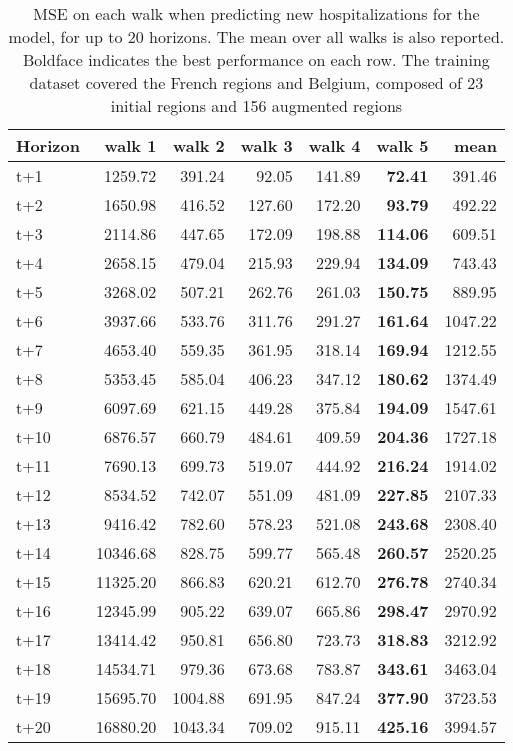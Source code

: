 \begin{table}[H]
\centering
\caption{MSE on each walk when predicting new hospitalizations for the model, for up to 20 horizons. The mean over all walks is also reported. Boldface indicates the best performance on each row. The training dataset covered the French regions and Belgium, composed of 23 initial regions and 156 augmented regions }
\label{tab:MSE_walk_custom_linear_regression}
\begin{tabular}{lrrrrrr}
\toprule
Horizon &   walk 1 &  walk 2 &  walk 3 &  walk 4 &  walk 5 &    mean \\
\midrule
t+1  & 1259.72  & 391.24  & 92.05  & 141.89  & \textbf{72.41}  & 391.46  \\
t+2  & 1650.98  & 416.52  & 127.60  & 172.20  & \textbf{93.79}  & 492.22  \\
t+3  & 2114.86  & 447.65  & 172.09  & 198.88  & \textbf{114.06}  & 609.51  \\
t+4  & 2658.15  & 479.04  & 215.93  & 229.94  & \textbf{134.09}  & 743.43  \\
t+5  & 3268.02  & 507.21  & 262.76  & 261.03  & \textbf{150.75}  & 889.95  \\
t+6  & 3937.66  & 533.76  & 311.76  & 291.27  & \textbf{161.64}  & 1047.22  \\
t+7  & 4653.40  & 559.35  & 361.95  & 318.14  & \textbf{169.94}  & 1212.55  \\
t+8  & 5353.45  & 585.04  & 406.23  & 347.12  & \textbf{180.62}  & 1374.49  \\
t+9  & 6097.69  & 621.15  & 449.28  & 375.84  & \textbf{194.09}  & 1547.61  \\
t+10  & 6876.57  & 660.79  & 484.61  & 409.59  & \textbf{204.36}  & 1727.18  \\
t+11  & 7690.13  & 699.73  & 519.07  & 444.92  & \textbf{216.24}  & 1914.02  \\
t+12  & 8534.52  & 742.07  & 551.09  & 481.09  & \textbf{227.85}  & 2107.33  \\
t+13  & 9416.42  & 782.60  & 578.23  & 521.08  & \textbf{243.68}  & 2308.40  \\
t+14  & 10346.68  & 828.75  & 599.77  & 565.48  & \textbf{260.57}  & 2520.25  \\
t+15  & 11325.20  & 866.83  & 620.21  & 612.70  & \textbf{276.78}  & 2740.34  \\
t+16  & 12345.99  & 905.22  & 639.07  & 665.86  & \textbf{298.47}  & 2970.92  \\
t+17  & 13414.42  & 950.81  & 656.80  & 723.73  & \textbf{318.83}  & 3212.92  \\
t+18  & 14534.71  & 979.36  & 673.68  & 783.87  & \textbf{343.61}  & 3463.04  \\
t+19  & 15695.70  & 1004.88  & 691.95  & 847.24  & \textbf{377.90}  & 3723.53  \\
t+20  & 16880.20  & 1043.34  & 709.02  & 915.11  & \textbf{425.16}  & 3994.57  \\

\bottomrule
\end{tabular}
\end{table}
